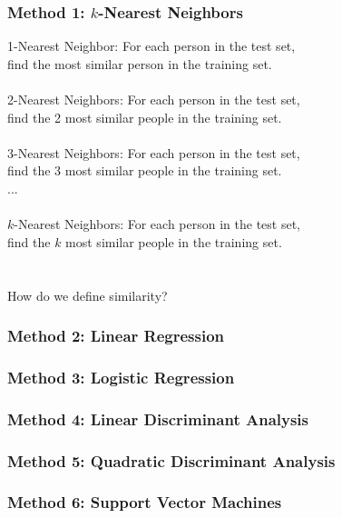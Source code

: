 \documentclass{beamer}
\begin{document}
\begin{frame}
\frametitle{Method 1: $k$-Nearest Neighbors}
1-Nearest Neighbor: For each person in the test set,\\
\hspace{2.5cm} find the most similar person in the training set.\\~\\
2-Nearest Neighbors: For each person in the test set,\\
\hspace{2.5cm} find the 2 most similar people in the training set.\\~\\
3-Nearest Neighbors: For each person in the test set,\\
\hspace{2.5cm} find the 3 most similar people in the training set.\\
...\\~\\
$k$-Nearest Neighbors: For each person in the test set,\\
\hspace{2.5cm} find the $k$ most similar people in the training set.\\~\\~\\
How do we define similarity?
\end{frame}

\begin{frame}
\frametitle{Method 2: Linear Regression}
\end{frame}

\begin{frame}
\frametitle{Method 3: Logistic Regression}
\end{frame}

\begin{frame}
\frametitle{Method 4: Linear Discriminant Analysis}
\end{frame}

\begin{frame}
\frametitle{Method 5: Quadratic Discriminant Analysis}
\end{frame}

\begin{frame}
\frametitle{Method 6: Support Vector Machines}
\end{frame}
\end{document}

